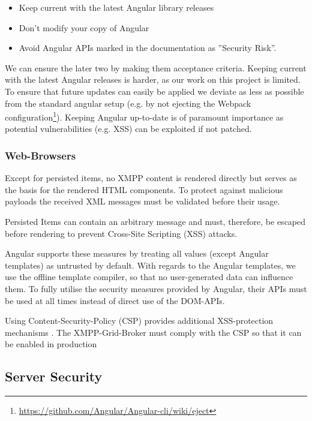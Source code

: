\begin{itemize}
    \item Keep current with the latest Angular library releases
    \item Don't modify your copy of Angular
    \item Avoid Angular APIs marked in the documentation as ''Security Risk''.
\end{itemize}

We can ensure the later two by making them acceptance criteria.
Keeping current with the latest Angular releases is harder, as our work on this project is limited.
To ensure that future updates can easily be applied we deviate as less as possible from the standard angular setup (e.g. by not ejecting the Webpack configuration\footnote{\url{https://github.com/Angular/Angular-cli/wiki/eject}}).
Keeping Angular up-to-date is of paramount importance as potential vulnerabilities (e.g. XSS) can be exploited if not patched. \cite{angular-security}

\subsubsection{Web-Browsers}

Except for persisted items, no XMPP content is rendered directly but serves as the basis for the rendered HTML components. %
To protect against malicious payloads the received XML messages must be validated before their usage. %

Persisted Items can contain an arbitrary message and must, therefore, be escaped before rendering to prevent Cross-Site Scripting (XSS) attacks.

Angular supports these measures by treating all values (except Angular templates) as untrusted by default.
With regards to the Angular templates, we use the offline template compiler, so that no user-generated data can influence them. To fully utilise the security measures provided by Angular, their APIs must be used at all times instead of direct use of the DOM-APIs.\cite{} 

Using Content-Security-Policy (CSP) provides additional XSS-protection mechanisms \cite{w3c-csp}.
The XMPP-Grid-Broker must comply with the CSP so that it can be enabled in production

\subsection{Server Security}

